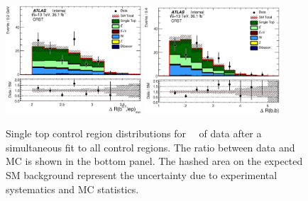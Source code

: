 \begin{figure}[h!]
\begin{center}
\includegraphics[width=0.45\textwidth]{figures/singleTop/postfit/MinDRBLep_CRST.eps}
\includegraphics[width=0.45\textwidth]{figures/singleTop/postfit/DRBB_CRST.eps}
\end{center}
\caption[Single top control region distributions for $\intlumi$ $\ifb$ of data after a simultaneous fit to all control regions]{Single top control region distributions for \intlumi\ \ifb\ of data after a simultaneous fit to all control regions. The ratio between data and MC is shown in the bottom panel. The hashed area on the expected SM background represent the uncertainty due to experimental systematics and MC statistics.}
\label{fig:CRST}
\end{figure}



